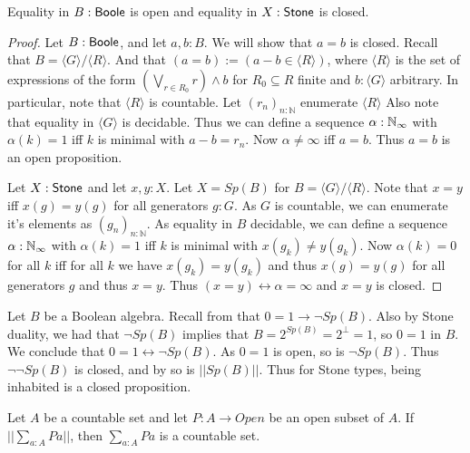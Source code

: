 \documentclass{../util/zariski-small}
\begin{document}
\begin{lemma}\label{EqualityBooleStoneClosedOpen}
  Equality in $B:\mathsf{Boole}$ is open and equality in $X:\mathsf{Stone}$ is closed. 
\end{lemma}
\begin{proof}
  Let $B:\mathsf{Boole}$, and let $a,b:B$. We will show that $a=b$ is closed. 
  Recall that $B = \langle G \rangle / \langle R \rangle$. 
  And that $(a=b):= (a-b \in \langle R \rangle)$, 
  where $\langle R \rangle$ is the set of expressions of the form
  $(\bigvee_{r\in R_0} r) \wedge b$ for $R_0\subseteq R$ finite and $b:\langle G \rangle$ 
  arbitrary. 
  In particular, note that $\langle R \rangle$ is countable. 
  Let $(r_n)_{n:\mathbb N}$ enumerate $ \langle R \rangle $
  Also note that equality in $\langle G \rangle$ is decidable. 
  Thus we can define a sequence $\alpha:\mathbb{N}_{\infty}$ with $\alpha(k) = 1$ 
  iff $k$ is minimal with $a -b = r_n$. 
  Now $\alpha \neq \infty $ iff $a = b$. Thus $a=b$ is an open proposition. 

  Let $X:\mathsf{Stone}$ and let $x,y:X$. 
  Let $X= Sp(B)$ for $B = \langle G \rangle / \langle R \rangle $. 
  Note that $x=y$ iff $x(g) = y(g)$ for all generators $g:G$. 
  As $G$ is countable, we can enumerate it's elements as $(g_n)_{n:\mathbb N}$. 
  As equality in $B$ decidable, we can define a sequence $\alpha:\mathbb{N}_{\infty}$ 
  with $\alpha(k) = 1$ iff $k$ is minimal with $x(g_k) \neq y(g_k)$. 
  Now $\alpha(k) = 0$ for all $k$ iff for all $k$ we have $x(g_k) = y(g_k)$ and thus $x(g) = y(g)$ for all generators $g$ 
  and thus $ x= y$. 
  Thus $(x=y) \leftrightarrow \alpha= \infty$ and $ x=y$ is closed. 
\end{proof}
\begin{corollary}\label{LemInhabitedOfStoneIsClosed}
  Let $B$ be a Boolean algebra.
  Recall from  that $0=1 \to \neg Sp(B)$. 
  Also by Stone duality, we had that $\neg Sp(B)$ implies that 
  $B = 2^{Sp(B)} = 2^\bot= 1$, so $0=1$ in $B$. 
  We conclude that $0=1 \leftrightarrow \neg Sp(B)$. 
  As $0=1$ is open, so is $\neg Sp(B)$. 
  Thus $\neg \neg Sp(B)$ is closed, and by  
  so is $||Sp(B)||$. 
  Thus for Stone types, being inhabited is a closed proposition. 
\end{corollary}
\begin{lemma}
  Let $A$ be a countable set and let $P:A \to Open$
  be an open subset of $A$. 
  If $||\sum_{a:A} P a||$, then $\sum_{a:A} P a$ is a countable set. 
\end{lemma}
\end{document}
